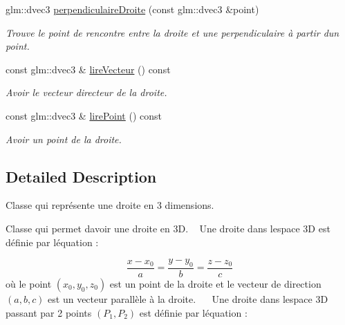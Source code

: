 \begin{DoxyCompactItemize}
glm\+::dvec3 \hyperlink{classmath_1_1_droite3_d_a4f3a9fb81926f775cd9e589c112c51db}{perpendiculaire\+Droite} (const glm\+::dvec3 \&point)
\begin{DoxyCompactList}\small\item\em Trouve le point de rencontre entre la droite et une perpendiculaire à partir d\textquotesingle{}un point. \end{DoxyCompactList}\item 
const glm\+::dvec3 \& \hyperlink{classmath_1_1_droite3_d_a903f20fd767699e95f747b4722e8aa04}{lire\+Vecteur} () const 
\begin{DoxyCompactList}\small\item\em Avoir le vecteur directeur de la droite. \end{DoxyCompactList}\item 
const glm\+::dvec3 \& \hyperlink{classmath_1_1_droite3_d_a5de95860b960b37e4c55f857f020c652}{lire\+Point} () const 
\begin{DoxyCompactList}\small\item\em Avoir un point de la droite. \end{DoxyCompactList}\end{DoxyCompactItemize}


\subsection{Detailed Description}
Classe qui représente une droite en 3 dimensions. 

Classe qui permet d\textquotesingle{}avoir une droite en 3\+D. ~\newline
Une droite dans l\textquotesingle{}espace 3\+D est définie par l\textquotesingle{}équation \+:

\[ \frac {x - x_0 } {a} = \frac { y - y_0 } {b} = \frac { z - z_0 } {c} \] où le point $ (x_0, y_0, z_0) $ est un point de la droite et le vecteur de direction $ (a, b, c) $ est un vecteur parallèle à la droite.~\newline
 ~\newline
Une droite dans l\textquotesingle{}espace 3\+D passant par 2 points $ ( P_1, P_2) $ est définie par l\textquotesingle{}équation \+:

